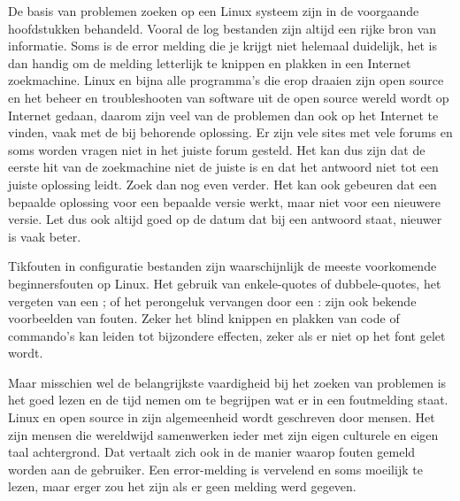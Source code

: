 De basis van problemen zoeken op een Linux systeem zijn in de voorgaande hoofdstukken behandeld. Vooral de log bestanden zijn altijd een rijke bron van informatie. Soms is de error melding die je krijgt niet helemaal duidelijk, het is dan handig om de melding letterlijk te knippen en plakken in een Internet zoekmachine. Linux en bijna alle programma's die erop draaien zijn open source en het beheer en troubleshooten van software uit de open source wereld wordt op Internet gedaan, daarom zijn veel van de problemen dan ook op het Internet te vinden, vaak met de bij behorende oplossing. Er zijn vele sites met vele forums en soms worden vragen niet in het juiste forum gesteld. Het kan dus zijn dat de eerste hit van de zoekmachine niet de juiste is en dat het antwoord niet tot een juiste oplossing leidt. Zoek dan nog even verder. Het kan ook gebeuren dat een bepaalde oplossing voor een bepaalde versie werkt, maar niet voor een nieuwere versie. Let dus ook altijd goed op de datum dat bij een antwoord staat, nieuwer is vaak beter.

Tikfouten in configuratie bestanden zijn waarschijnlijk de meeste voorkomende beginnersfouten op Linux. Het gebruik van enkele-quotes of dubbele-quotes, het vergeten van een ; of het perongeluk vervangen door een : zijn ook bekende voorbeelden van fouten. Zeker het blind knippen en plakken van code of commando's kan leiden tot bijzondere effecten, zeker als er niet op het font gelet wordt.

Maar misschien wel de belangrijkste vaardigheid bij het zoeken van problemen is het goed lezen en de tijd nemen om te begrijpen wat er in een foutmelding staat. Linux en open source in zijn algemeenheid wordt geschreven door mensen. Het zijn mensen die wereldwijd samenwerken ieder met zijn eigen culturele en eigen taal achtergrond. Dat vertaalt zich ook in de manier waarop fouten gemeld worden aan de gebruiker. Een error-melding is vervelend en soms moeilijk te lezen, maar erger zou het zijn als er geen melding werd gegeven.


